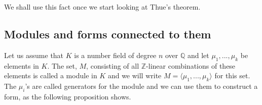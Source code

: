 \documentclass{article}
\newcommand{\mbb}[1]{\mathbb{#1}}
\numberwithin{equation}{section}
\begin{document}
We shall use this fact once we start looking at Thue's theorem.




\subsection{Modules and forms connected to them}
Let us assume that $K$ is a number field of degree $n$ over $\mbb Q$ and let $\mu_1, ..., \mu_k$ be elements in $K$. The set, $M$, consisting of all $\mbb{Z}$-linear combinations of these elements is called a module in $K$ and we will write $M = \langle \mu_1, ..., \mu_k \rangle$ for this set. The $\mu_i$'s are called generators for the module and we can use them to construct a form, as the following proposition shows.
\end{document}
